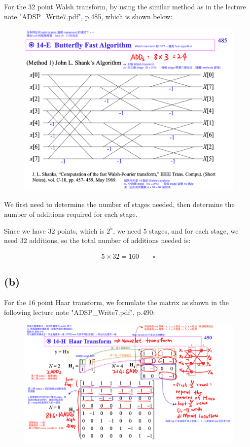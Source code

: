 \documentclass{article}
\begin{document}
For the $32$ point Walsh transform, 
by using the similar method as in the lecture note "ADSP\_Write7.pdf", p.485, 
which is shown below:

\begin{figure}[H]
    \centering
    \includegraphics[width=\textwidth]{HW5_img/6_a.png}
\end{figure}

We first need to determine the number of stages needed, 
then determine the number of additions required for each stage.

Since we have $32$ points, which is $2^5$, we need $5$ stages, 
and for each stage, we need $32$ additions, so the total number of additions needed is:

\begin{align*}
    5 \times 32 = 160 \qquad \square
\end{align*}

\subsection*{(b)}

For the $16$ point Haar transform, 
we formulate the matrix as shown in the following lecture note "ADSP\_Write7.pdf", p.490:

\begin{figure}[H]
    \centering
    \includegraphics[width=\textwidth]{HW5_img/6_b.png}
\end{figure}
\end{document}
